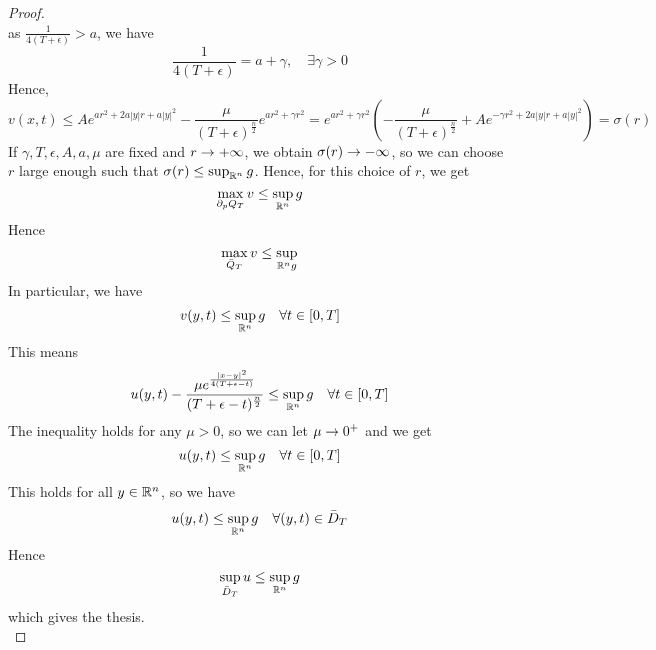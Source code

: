 \begin{ProofBox}
\begin{proof}
\begin{equation*}
        \end{equation*}
        as $\frac{1}{4(T+\epsilon)} > a$, we have 
        \begin{equation*}
            \frac{1}{4(T+\epsilon)} = a + \gamma, \quad \exists \gamma > 0
        \end{equation*}
        Hence,
        \begin{equation*}
            v(x,t) \leq A e^{a r^2 + 2 a |y| r + a |y|^2} - \frac{\mu}{(T+\epsilon)^\frac{n}{2}} e^{ar^2+\gamma r^2} = e^{a r^2 + \gamma r^2} (-\frac{\mu}{(T+\epsilon )^\frac{n}{2}} + A e^{-\gamma r^2 + 2 a |y| r + a |y|^2}) = \sigma(r)
        \end{equation*}
        If $\gamma, T, \epsilon, A, a, \mu$ are fixed and $r \rightarrow +\infty$, we obtain $\sigma(r) \rightarrow -\infty$, so we can choose $r$ large enough such that $\sigma(r) \leq \sup_{\mathbb{R}^n} g$. Hence, for this choice of $r$, we get
        \begin{equation*}
            \max_{\partial_p Q_T} v \leq \sup_{\mathbb{R}^n}g
        \end{equation*}
        Hence
        \begin{equation*}
            \max_{\Bar{Q}_T} v \leq \sup_{\mathbb{R}^n g}
        \end{equation*}
        In particular, we have
        \begin{equation*}
            v(y,t) \leq \sup_{\mathbb{R}^n}g \quad \forall t \in [0,T]
        \end{equation*}
        This means 
        \begin{equation*}
            u(y,t) - \frac{\mu e^{\frac{|x-y|^2}{4(T+\epsilon -t)}}}{(T+\epsilon -t)^\frac{n}{2}} \leq \sup_{\mathbb{R}^n} g \quad \forall t \in [0, T]
        \end{equation*}
        The inequality holds for any $\mu > 0$, so we can let $\mu \rightarrow 0^+$ and we get 
        \begin{equation*}
            u(y,t) \leq \sup_{\mathbb{R}^n} g \quad \forall t \in [0,T]
        \end{equation*}
        This holds for all $y \in \mathbb{R}^n$, so we have
        \begin{equation*}
            u(y,t) \leq \sup_{\mathbb{R}^n} g \quad \forall (y,t) \in \Bar{D}_T
        \end{equation*}
        Hence
        \begin{equation*}
            \sup_{\Bar{D}_T} u \leq \sup_{\mathbb{R}^n} g
        \end{equation*}
        which gives the thesis. \\

\end{proof}
\end{ProofBox}
